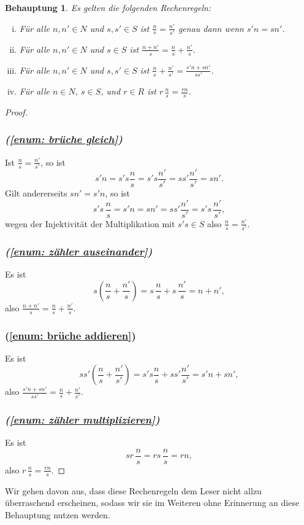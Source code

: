 \documentclass[a4paper,10pt]{article}
\newcounter{satze}
\newtheorem{beh}[satze]{Behauptung}
\theoremstyle{definition}
\begin{document}
\begin{beh}
 Es gelten die folgenden Rechenregeln:
 \begin{enumerate}[(i)]
  \item Für alle $n, n' \in N$ und $s, s' \in S$ ist $\frac{n}{s} = \frac{n'}{s'}$ genau dann wenn $s'n = sn'$. \label{enum: brüche gleich}
  \item Für alle $n, n' \in N$ und $s \in S$ ist $\frac{n+n'}{s} = \frac{n}{s} + \frac{n'}{s}$. \label{enum: zähler auseinander}
  \item Für alle $n, n' \in N$ und $s, s' \in S$ ist $\frac{n}{s} + \frac{n'}{s'} = \frac{s'n + sn'}{ss'}$. \label{enum: brüche addieren}
  \item Für alle $n \in N$, $s \in S$, und $r \in R$ ist $r\, \frac{n}{s} = \frac{rn}{s}$. \label{enum: zähler multiplizieren}
 \end{enumerate}
\end{beh}
\begin{proof}
 \subsubsection*{\emph{(\ref{enum: brüche gleich})}}
 Ist $\frac{n}{s} = \frac{n'}{s'}$, so ist
 \[
  s'n = s's\frac{n}{s} = s's\frac{n'}{s'} = ss'\frac{n'}{s'} = sn'.
 \]
 Gilt andererseits $sn' = s'n$, so ist
 \[
  s's \, \frac{n}{s} = s'n = sn' = ss'\frac{n'}{s'} = s's \, \frac{n'}{s'},
 \]
 wegen der Injektivität der Multiplikation mit $s's \in S$ also $\frac{n}{s} = \frac{n'}{s'}$.
 \subsubsection*{\emph{(\ref{enum: zähler auseinander})}}
 Es ist
 \[
  s\left( \frac{n}{s} + \frac{n'}{s} \right)
  = s \, \frac{n}{s} + s \, \frac{n'}{s}
  = n + n',
 \]
 also $\frac{n+n'}{s} = \frac{n}{s} + \frac{n'}{s}$.
 \subsubsection*{\emph{}(\ref{enum: brüche addieren})}
 Es ist
 \[
  ss' \left( \frac{n}{s} + \frac{n'}{s'} \right)
  = s' s \frac{n}{s} + s s' \frac{n'}{s'}
  = s' n + s n',
 \]
 also $\frac{s' n + s n'}{ss'} = \frac{n}{s} + \frac{n'}{s'}$.
 \subsubsection*{\emph{(\ref{enum: zähler multiplizieren})}}
 Es ist
 \[
  s r \, \frac{n}{s}
  = r s \, \frac{n}{s}
  = rn,
 \]
 also $r \, \frac{n}{s} = \frac{rn}{s}$.
\end{proof}
Wir gehen davon aus, dass diese Rechenregeln dem Leser nicht allzu überraschend erscheinen, sodass wir sie im Weiteren ohne Erinnerung an diese Behauptung nutzen werden.
\end{document}
